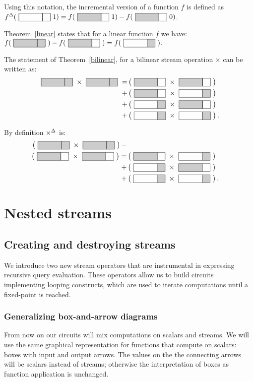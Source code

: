 Using this notation, the incremental version of a function $f$ is defined
as $\inc{f}(\strm{0}{1}) = f(\strm{1}{1}) - f(\strm{1}{0})$.

Theorem~\ref{linear} states that for a linear function $f$ we have: \\
$f(\strm{1 1}) - f(\strm{1 0}) = f(\strm{0 1}).$

The statement of Theorem~\ref{bilinear}, for a bilinear stream operation 
$\times$ can be written as:
$$
\begin{aligned}
\strm{1 1} \times \strm{1 1} = & 
\matmult{\strm{1 0}}{\strm{1 0}} \\ + & 
\matmult{\strm{1 0}}{\strm{0 1}} \\ + & 
\matmult{\strm{0 1}}{\strm{1 0}} \\ + & 
\matmult{\strm{0 1}}{\strm{0 1}}.
\end{aligned}
$$

By definition ${\times}^{\Delta}$ is: 
$$
\begin{aligned}
\matmult{\strm{1 1}}{\strm{1 1}} - \\
\matmult{\strm{1 0}}{\strm{1 0}} = &
\matmult{\strm{1 0}}{\strm{0 1}} \\ + & 
\matmult{\strm{0 1}}{\strm{1 0}} \\ + & 
\matmult{\strm{0 1}}{\strm{0 1}}.
\end{aligned}
$$

\section{Nested streams}

\subsection{Creating and destroying streams}\label{sec:stream-intro-elim}

We introduce two new stream operators that are instrumental in
expressing recursive query evaluation.  These operators allow us
to build circuits implementing looping constructs, which 
are used to iterate computations until a fixed-point is reached.

\subsubsection{Generalizing box-and-arrow diagrams}

From now on our circuits will mix computations on scalars and streams.
We will use the same graphical representation for functions that compute
on scalars: boxes with input and output arrows.  The values on the
the connecting arrows will be scalars instead of streams; otherwise
the interpretation of boxes as function application is unchanged.

